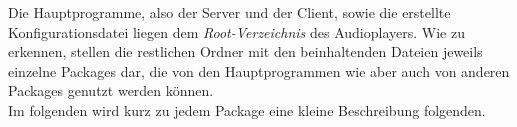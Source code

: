 
Die Hauptprogramme, also der Server und der Client, sowie die erstellte
Konfigurationsdatei liegen dem \textit{Root-Verzeichnis} des Audioplayers. Wie
zu erkennen, stellen die restlichen Ordner mit den beinhaltenden Dateien
jeweils einzelne Packages dar, die von den Hauptprogrammen wie aber auch von
anderen Packages genutzt werden können. \\
Im folgenden wird kurz zu jedem Package eine kleine Beschreibung folgenden.
